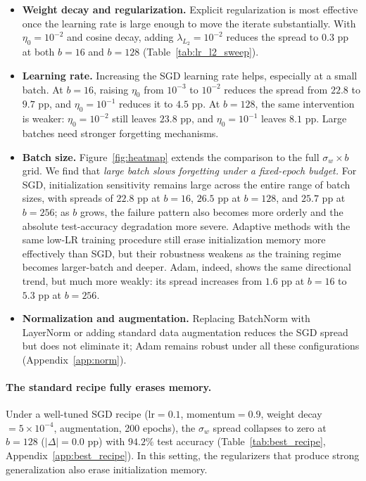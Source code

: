 \documentclass{article}
\newcommand{\sigw}{\sigma_w}
\begin{document}
\begin{itemize}[leftmargin=0.8em,itemsep=0.25em]
\item \textbf{Weight decay and regularization.} Explicit regularization is most effective once the learning rate is large enough to move the iterate substantially. With $\eta_0=10^{-2}$ and cosine decay, adding $\lambda_{L_2}=10^{-2}$ reduces the spread to $0.3$ pp at both $b=16$ and $b=128$ (Table~\ref{tab:lr_l2_sweep}).
\item \textbf{Learning rate.} Increasing the SGD learning rate helps, especially at a small batch. At $b=16$, raising $\eta_0$ from $10^{-3}$ to $10^{-2}$ reduces the spread from $22.8$ to $9.7$ pp, and $\eta_0=10^{-1}$ reduces it to $4.5$ pp.  At $b=128$, the same intervention is weaker: $\eta_0=10^{-2}$ still leaves $23.8$ pp, and $\eta_0=10^{-1}$ leaves $8.1$ pp.  Large batches need stronger forgetting mechanisms.
\item \textbf{Batch size.} Figure~\ref{fig:heatmap} extends the comparison to the full $\sigw \times b$ grid. We find that \textit{large batch slows forgetting under a fixed-epoch budget.} For SGD, initialization sensitivity remains large across the entire range of batch sizes, with spreads of $22.8$ pp at $b=16$, $26.5$ pp at $b=128$, and $25.7$ pp at $b=256$; as $b$ grows, the failure pattern also becomes more orderly and the absolute test-accuracy degradation more severe. Adaptive methods with the same low-LR training procedure still erase initialization memory more effectively than SGD, but their robustness weakens as the training regime becomes larger-batch and deeper. Adam, indeed, shows the same directional trend, but much more weakly: its spread increases from $1.6$ pp at $b=16$ to $5.3$ pp at $b=256$. 

\item \textbf{Normalization and augmentation.} Replacing BatchNorm with LayerNorm or adding standard data augmentation reduces the SGD spread but does not eliminate it; Adam remains robust under all these configurations (Appendix~\ref{app:norm}).

\end{itemize}

\paragraph{The standard recipe fully erases memory.}
Under a well-tuned SGD recipe (lr$=0.1$, momentum$=0.9$, weight decay$=5\!\times\!10^{-4}$, augmentation, 200 epochs), the $\sigma_w$ spread collapses to zero at $b{=}128$ (\(|\Delta|=0.0\) pp) with $94.2\%$ test accuracy (Table~\ref{tab:best_recipe}, Appendix~\ref{app:best_recipe}). In this setting, the regularizers that produce strong generalization also erase initialization memory.
\vspace{-0.6em}
\end{document}
